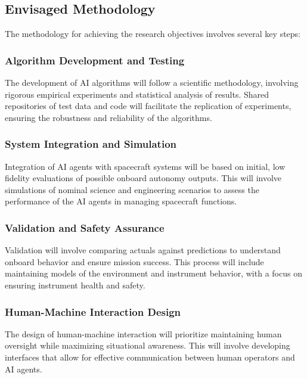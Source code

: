 \documentclass[a4paper,12pt]{article}
\begin{document}
\subsection{Envisaged Methodology}

The methodology for achieving the research objectives involves several key steps:

\subsubsection{Algorithm Development and Testing}

The development of AI algorithms will follow a scientific methodology, involving rigorous empirical experiments and statistical analysis of results. Shared repositories of test data and code will facilitate the replication of experiments, ensuring the robustness and reliability of the algorithms.

\subsubsection{System Integration and Simulation}

Integration of AI agents with spacecraft systems will be based on initial, low fidelity evaluations of possible onboard autonomy outputs. This will involve simulations of nominal science and engineering scenarios to assess the performance of the AI agents in managing spacecraft functions.

\subsubsection{Validation and Safety Assurance}

Validation will involve comparing actuals against predictions to understand onboard behavior and ensure mission success. This process will include maintaining models of the environment and instrument behavior, with a focus on ensuring instrument health and safety.

\subsubsection{Human-Machine Interaction Design}

The design of human-machine interaction will prioritize maintaining human oversight while maximizing situational awareness. This will involve developing interfaces that allow for effective communication between human operators and AI agents.
\end{document}
